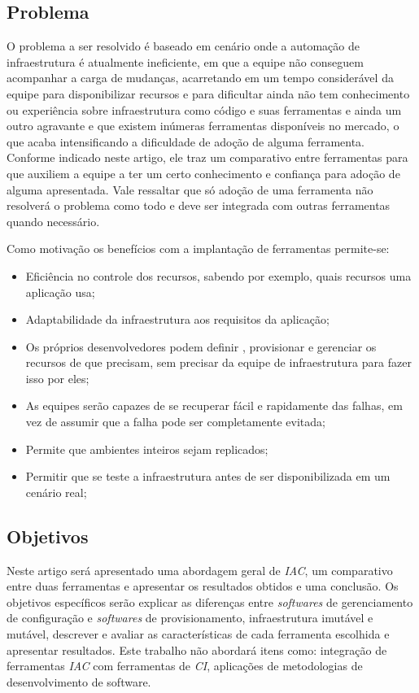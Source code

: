 \subsection{Problema}

O problema a ser resolvido é baseado em cenário onde a automação de infraestrutura é atualmente ineficiente, em que a equipe não conseguem acompanhar a carga de mudanças, acarretando em um tempo considerável da equipe para disponibilizar recursos e para dificultar ainda não tem conhecimento ou experiência sobre infraestrutura como código e suas ferramentas e ainda um outro agravante e que existem inúmeras ferramentas disponíveis no mercado, o que acaba intensificando a dificuldade de adoção de alguma ferramenta. Conforme indicado neste artigo, ele traz um comparativo entre ferramentas para que auxiliem a equipe a ter um certo conhecimento e confiança para adoção de alguma apresentada. Vale ressaltar que só adoção de uma ferramenta não resolverá o problema como todo e deve ser integrada com outras ferramentas quando necessário.  


  Como motivação os benefícios com a implantação de ferramentas permite-se:  
\begin{itemize}
 \item Eficiência no controle dos recursos, sabendo por exemplo, quais recursos uma aplicação usa;
 \item Adaptabilidade da infraestrutura aos requisitos da aplicação;
 \item Os próprios desenvolvedores podem definir , provisionar e gerenciar os recursos de que precisam, sem precisar da equipe de infraestrutura para fazer isso por eles;

\item As equipes serão capazes de se recuperar fácil e rapidamente das falhas, em vez de assumir que a falha pode ser completamente evitada;

\item Permite que ambientes inteiros sejam replicados;

\item Permitir que se teste a infraestrutura antes de ser disponibilizada em um cenário real;
\end{itemize} 


\subsection{Objetivos}

Neste artigo será apresentado uma abordagem geral de \textit{IAC}, um comparativo entre duas ferramentas e apresentar os resultados obtidos e uma conclusão. Os objetivos específicos serão explicar as diferenças entre \textit{softwares} de gerenciamento de configuração e \textit{softwares} de provisionamento, infraestrutura imutável e mutável, descrever e avaliar as características de cada ferramenta escolhida e apresentar resultados. Este trabalho não abordará itens como: integração de ferramentas \textit{IAC} com ferramentas de \textit{CI}, aplicações de metodologias de desenvolvimento de software. 

